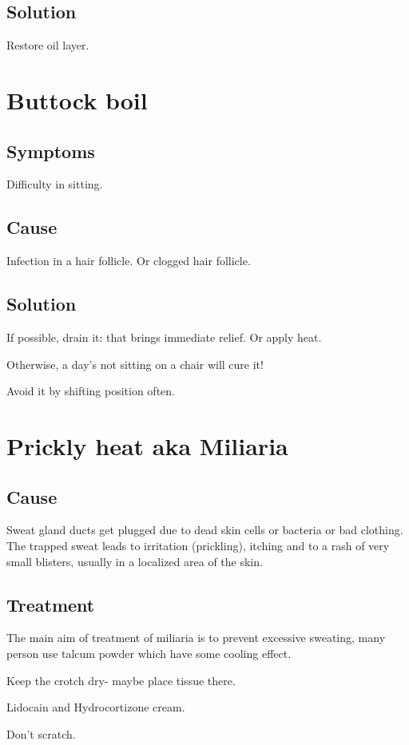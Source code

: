 \documentclass[oneside, article]{memoir}
\begin{document}
\subsection{Solution} Restore oil layer.

\section{Buttock boil}
\subsection{Symptoms}
Difficulty in sitting.

\subsection{Cause}
Infection in a hair follicle. Or clogged hair follicle.

\subsection{Solution}
If possible, drain it: that brings immediate relief. Or apply heat.

Otherwise, a day's not sitting on a chair will cure it!

Avoid it by shifting position often.

\section{Prickly heat aka Miliaria}
\subsection{Cause}
Sweat gland ducts get plugged due to dead skin cells or bacteria or bad clothing. The trapped sweat leads to irritation (prickling), itching and to a rash of very small blisters, usually in a localized area of the skin.

\subsection{Treatment}
The main aim of treatment of miliaria is to prevent excessive sweating, many person use talcum powder which have some cooling effect.

Keep the crotch dry- maybe place tissue there.

Lidocain and Hydrocortizone cream.

Don't scratch.
\end{document}
